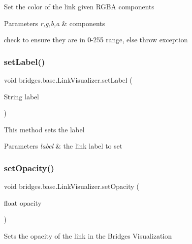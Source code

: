 Set the color of the link given R\+G\+BA components


\begin{DoxyParams}{Parameters}
{\em r,g,b,a} & components\\
\hline
\end{DoxyParams}
check to ensure they are in 0-\/255 range, else throw exception \mbox{\label{classbridges_1_1base_1_1_link_visualizer_a073d84e04dd95c3848c9f4e0ad74eb77}} 
\subsubsection{\texorpdfstring{set\+Label()}{setLabel()}}
{\footnotesize\ttfamily void bridges.\+base.\+Link\+Visualizer.\+set\+Label (\begin{DoxyParamCaption}\item[{String}]{label }\end{DoxyParamCaption})}

This method sets the label


\begin{DoxyParams}{Parameters}
{\em label} & the link label to set \\
\hline
\end{DoxyParams}
\mbox{\label{classbridges_1_1base_1_1_link_visualizer_ac0d59614dbc65ed0a19c25c493a1deaa}} 
\subsubsection{\texorpdfstring{set\+Opacity()}{setOpacity()}}
{\footnotesize\ttfamily void bridges.\+base.\+Link\+Visualizer.\+set\+Opacity (\begin{DoxyParamCaption}\item[{float}]{opacity }\end{DoxyParamCaption})}

Sets the opacity of the link in the Bridges Visualization


